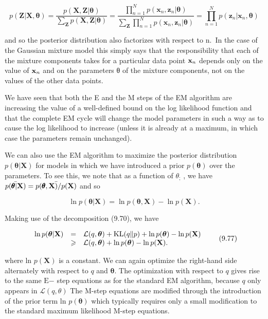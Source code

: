 \documentclass[
  10
]{article}
\begin{document}
\[
p (\mathbf {Z} | \mathbf {X}, \boldsymbol {\theta}) = \frac {p (\mathbf {X} , \mathbf {Z} | \boldsymbol {\theta})}{\sum_ {\mathbf {Z}} p (\mathbf {X} , \mathbf {Z} | \boldsymbol {\theta})} = \frac {\prod_ {n = 1} ^ {N} p (\mathbf {x} _ {n} , \mathbf {z} _ {n} | \boldsymbol {\theta})}{\sum_ {\mathbf {Z}} \prod_ {n = 1} ^ {N} p (\mathbf {x} _ {n} , \mathbf {z} _ {n} | \boldsymbol {\theta})} = \prod_ {n = 1} ^ {N} p (\mathbf {z} _ {n} | \mathbf {x} _ {n}, \boldsymbol {\theta})\tag{9.75}
\]

and so the posterior distribution also factorizes with respect to n.~In
the case of the Gaussian mixture model this simply says that the
responsibility that each of the mixture components takes for a
particular data point \({ \bf x } _ { n }\) depends only on the value of
\({ \bf x } _ { n }\) and on the parameters θ of the mixture components,
not on the values of the other data points.

We have seen that both the E and the M steps of the EM algorithm are
increasing the value of a well-defined bound on the log likelihood
function and that the complete EM cycle will change the model parameters
in such a way as to cause the log likelihood to increase (unless it is
already at a maximum, in which case the parameters remain unchanged).

We can also use the EM algorithm to maximize the posterior distribution
\(p ( \pmb \theta | \mathbf X )\) for models in which we have introduced
a prior \(p ( \pmb \theta )\) over the parameters. To see this, we note
that as a function of \(\theta _ { ; }\) , we have
\(\bar { p ( { \pmb \theta } | { \bf X } ) } = \bar { p ( { \pmb \theta } , { \bf X } ) / p ( { \bf X } ) }\)
and so

\[
\ln p (\boldsymbol {\theta} | \mathbf {X}) = \ln p (\boldsymbol {\theta}, \mathbf {X}) - \ln p (\mathbf {X}).\tag{9.76}
\]

Making use of the decomposition (9.70), we have

\[
\begin{array}{r c l} \ln p (\boldsymbol {\theta} | \mathbf {X}) & = & \mathcal {L} (q, \boldsymbol {\theta}) + \mathrm{KL} (q \| p) + \ln p (\boldsymbol {\theta}) - \ln p (\mathbf {X}) \\ & \geqslant & \mathcal {L} (q, \boldsymbol {\theta}) + \ln p (\boldsymbol {\theta}) - \ln p (\mathbf {X}). \end{array}\tag{9.77}
\]

where ln \(p ( \mathbf { X } )\) is a constant. We can again optimize
the right-hand side alternately with respect to \(q\) and
\(\pmb { \theta } .\) The optimization with respect to \(q\) gives rise
to the same \(\mathrm { E } \mathrm { - }\) step equations as for the
standard EM algorithm, because \(q\) only appears in
\(\mathcal { L } ( q , \theta )\) The M-step equations are modified
through the introduction of the prior term ln \(p ( \pmb \theta )\)
which typically requires only a small modification to the standard
maximum likelihood M-step equations.
\end{document}
